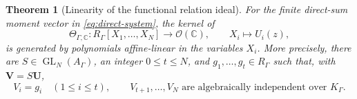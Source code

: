 \documentclass[11pt]{article}
\numberwithin{equation}{section}
\newtheorem{theorem}{Theorem}[section]
\theoremstyle{definition}
\theoremstyle{remark}
\newcommand{\C}{\mathbb C}
\begin{document}
\begin{theorem}[Linearity of the functional relation ideal]
\label{thm:functional-linearity}
For the finite direct-sum moment vector in \eqref{eq:direct-system}, the
kernel of
\begin{equation}\label{eq:functional-map-C}
  \Theta_{\Gamma,\C}:
  R_\Gamma[X_1,\ldots,X_N]\longrightarrow\mathscr O(\C),
  \qquad
  X_i\longmapsto U_i(z),
\end{equation}
is generated by polynomials affine-linear in the variables $X_i$.
More precisely, there are $S\in\operatorname{GL}_N(A_\Gamma)$, an integer
$0\le t\le N$, and $g_1,\ldots,g_t\in R_\Gamma$ such that, with
$\mathbf V=S\mathbf U$,
\begin{equation}\label{eq:split-coordinates}
  V_i=g_i\quad(1\le i\le t),
  \qquad
  V_{t+1},\ldots,V_N
  \text{ are algebraically independent over }K_\Gamma.
\end{equation}
\end{theorem}
\end{document}
